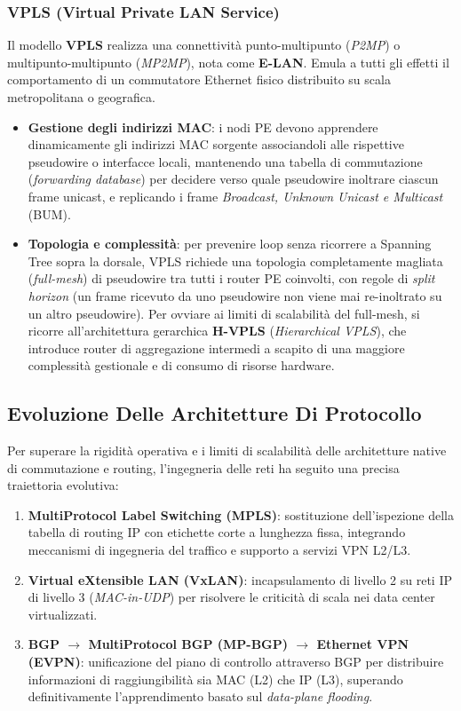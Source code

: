 \documentclass[11pt, a4paper]{article}
\begin{document}
\subsubsection{VPLS (Virtual Private LAN Service)}
Il modello \textbf{VPLS} realizza una connettività punto-multipunto (\emph{P2MP}) o multipunto-multipunto (\emph{MP2MP}), nota come \textbf{E-LAN}. Emula a tutti gli effetti il comportamento di un commutatore Ethernet fisico distribuito su scala metropolitana o geografica.
\begin{itemize}[noitemsep]
    \item \textbf{Gestione degli indirizzi MAC}: i nodi PE devono apprendere dinamicamente gli indirizzi MAC sorgente associandoli alle rispettive pseudowire o interfacce locali, mantenendo una tabella di commutazione (\emph{forwarding database}) per decidere verso quale pseudowire inoltrare ciascun frame unicast, e replicando i frame \emph{Broadcast, Unknown Unicast e Multicast} (BUM).
    \item \textbf{Topologia e complessità}: per prevenire loop senza ricorrere a Spanning Tree sopra la dorsale, VPLS richiede una topologia completamente magliata (\emph{full-mesh}) di pseudowire tra tutti i router PE coinvolti, con regole di \emph{split horizon} (un frame ricevuto da uno pseudowire non viene mai re-inoltrato su un altro pseudowire). Per ovviare ai limiti di scalabilità del full-mesh, si ricorre all'architettura gerarchica \textbf{H-VPLS} (\emph{Hierarchical VPLS}), che introduce router di aggregazione intermedi a scapito di una maggiore complessità gestionale e di consumo di risorse hardware.
\end{itemize}

\subsection{Evoluzione Delle Architetture Di Protocollo}
Per superare la rigidità operativa e i limiti di scalabilità delle architetture native di commutazione e routing, l'ingegneria delle reti ha seguito una precisa traiettoria evolutiva:
\begin{enumerate}[noitemsep]
    \item \textbf{MultiProtocol Label Switching (MPLS)}: sostituzione dell'ispezione della tabella di routing IP con etichette corte a lunghezza fissa, integrando meccanismi di ingegneria del traffico e supporto a servizi VPN L2/L3.
    \item \textbf{Virtual eXtensible LAN (VxLAN)}: incapsulamento di livello 2 su reti IP di livello 3 (\emph{MAC-in-UDP}) per risolvere le criticità di scala nei data center virtualizzati.
    \item \textbf{BGP $\rightarrow$ MultiProtocol BGP (MP-BGP) $\rightarrow$ Ethernet VPN (EVPN)}: unificazione del piano di controllo attraverso BGP per distribuire informazioni di raggiungibilità sia MAC (L2) che IP (L3), superando definitivamente l'apprendimento basato sul \emph{data-plane flooding}.
\end{enumerate}
\end{document}
